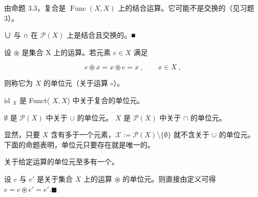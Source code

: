 \begin{example}

\begin{items}
\item

由命题 3.3，复合是  $ \operatorname{F u n c}(X,X) $ 上的结合运算。它可能不是交换的（见习题 3）。

\item

∪ 与 ∩ 在  $ \mathcal{P}(X) $ 上是结合且交换的。■

\end{items}

设  $ \circledast $ 是集合 X 上的运算。若元素  $ e \in X $ 满足

\[
e\circledast x=x\circledast e=x~,\qquad x\in X~,
\]

则称它为 $X$ 的单位元（关于运算 $\circ$）。

\end{example}

\begin{example}

\begin{items}
\item

id $ _{X} $ 是 Funct( $ X, X $) 中关于复合的单位元。

\item

$ \emptyset $ 是  $ \mathcal{P}(X) $ 中关于  $ \cup $ 的单位元。 $ X $ 是  $ \mathcal{P}(X) $ 中关于  $ \cap $ 的单位元。

\item

显然，只要  $ X $ 含有多于一个元素，$ \mathcal{X} := \mathcal{P}(X) \setminus \{\emptyset\} $ 就不含关于  $ \cup $ 的单位元。
下面的命题表明，单位元只要存在就是唯一的。

\end{items}

\end{example}

\begin{proposition}

关于给定运算的单位元至多有一个。

\proofhead
设 $e$ 与 $e'$ 是关于集合 $X$ 上的运算 $\circledast$ 的单位元。则直接由定义可得 $e = e \circledast e' = e'. \blacksquare$
\end{proposition}

